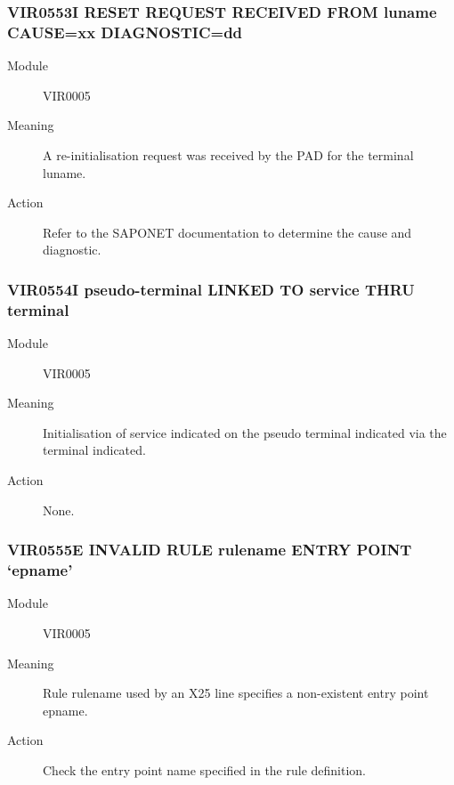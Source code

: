 \documentclass[letterpaper,10pt,english]{sphinxmanual}
\begin{document}
\subsubsection{VIR0553I RESET REQUEST RECEIVED FROM luname CAUSE=xx DIAGNOSTIC=dd}
\label{\detokenize{messages:vir0553i-reset-request-received-from-luname-cause-xx-diagnostic-dd}}\begin{description}
\item[{Module}] \leavevmode
VIR0005

\item[{Meaning}] \leavevmode
A re-initialisation request was received by the PAD for the terminal luname.

\item[{Action}] \leavevmode
Refer to the SAPONET documentation to determine the cause and diagnostic.

\end{description}


\subsubsection{VIR0554I pseudo-terminal LINKED TO service THRU terminal}
\label{\detokenize{messages:vir0554i-pseudo-terminal-linked-to-service-thru-terminal}}\begin{description}
\item[{Module}] \leavevmode
VIR0005

\item[{Meaning}] \leavevmode
Initialisation of service indicated on the pseudo terminal indicated via the terminal indicated.

\item[{Action}] \leavevmode
None.

\end{description}


\subsubsection{VIR0555E INVALID RULE rulename ENTRY POINT ‘epname’}
\label{\detokenize{messages:vir0555e-invalid-rule-rulename-entry-point-epname}}\begin{description}
\item[{Module}] \leavevmode
VIR0005

\item[{Meaning}] \leavevmode
Rule rulename used by an X25 line specifies a non-existent entry point epname.

\item[{Action}] \leavevmode
Check the entry point name specified in the rule definition.

\end{description}
\end{document}
